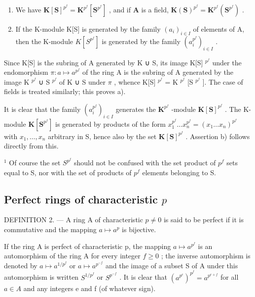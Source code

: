 \begin{enumerate}
\def\labelenumi{\alph{enumi})}
\item
  We have \(\mathbf{K}[\mathbf{S}]^{p^f} = \mathbf{K}^{p^f}[\mathbf{S}^{p^f}]\) , and if \(\mathbf{A}\) is a field, \(\mathbf{K}(\mathbf{S})^{p^f} = \mathbf{K}^{p^f}(\mathbf{S}^{p^f})\) .
\item
  If the K-module K{[}S{]} is generated by the family \((a_{i})_{i\in I}\) of elements of A, then the K-module \(K[S^{p^{f}}]\) is generated by the family \((a_{i}^{p^{f}})_{i\in I}\) .
\end{enumerate}

Since K{[}S{]} is the subring of A generated by K ∪ S, its image K{[}S{]} \(^{p^{f}}\) under the endomorphism \(\pi: a \mapsto a^{p^{f}}\) of the ring A is the subring of A generated by the image K \(^{p^{f}}\) ∪ S \(^{p^{f}}\) of K ∪ S under \(\pi\) , whence K{[}S{]} \(^{p^{f}}\) = K \(^{p^{f}}\) {[}S \(^{p^{f}}\) {]}. The case of fields is treated similarly; this proves a).

It is clear that the family \((a_i^{p^f})_{i\in I}\) generates the \(\mathbf{K}^{p^f}\) -module \(\mathbf{K}[\mathbf{S}]^{p^f}\) . The K-module \(\mathbf{K}[\mathbf{S}^{p^f}]\) is generated by products of the form \(x_1^{p^f}\ldots x_n^{p^f} = (x_1\ldots x_n)^{p^f}\) with \(x_1,\ldots ,x_n\) arbitrary in S, hence also by the set \(\mathbf{K}[\mathbf{S}]^{p^f}\) . Assertion b) follows directly from this.

\(^{1}\) Of course the set \(S^{p^{f}}\) should not be confused with the set product of \(p^{f}\) sets equal to S, nor with the set of products of \(p^{f}\) elements belonging to S.

\subsection{\texorpdfstring{Perfect rings of characteristic \(p\)}{Perfect rings of characteristic p}}

DEFINITION 2. --- A ring A of characteristic \(p \neq 0\) is said to be perfect if it is commutative and the mapping \(a \mapsto a^p\) is bijective.

If the ring A is perfect of characteristic p, the mapping \(a \mapsto a^{p^{f}}\) is an automorphism of the ring A for every integer \(f \geqslant 0\) ; the inverse automorphism is denoted by \(a \mapsto a^{1/p^{f}}\) or \(a \mapsto a^{p^{-f}}\) and the image of a subset S of A under this automorphism is written \(S^{1/p^{f}}\) or \(S^{p^{-f}}\) . It is clear that \((a^{p^{e}})^{p^{f}} = a^{p^{e+f}}\) for all \(a \in A\) and any integers e and f (of whatever sign).

